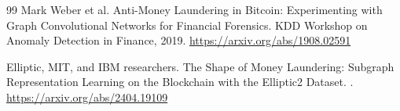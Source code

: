 \documentclass[11pt]{article}
\begin{document}
\begin{thebibliography}{99}
Mark Weber et al.
\newblock Anti-Money Laundering in Bitcoin: Experimenting with Graph Convolutional Networks for Financial Forensics.
\newblock KDD Workshop on Anomaly Detection in Finance, 2019.
\newblock \url{https://arxiv.org/abs/1908.02591}

Elliptic, MIT, and IBM researchers.
\newblock The Shape of Money Laundering: Subgraph Representation Learning on the Blockchain with the Elliptic2 Dataset.
.
\newblock \url{https://arxiv.org/abs/2404.19109}

\end{thebibliography}
\end{document}
